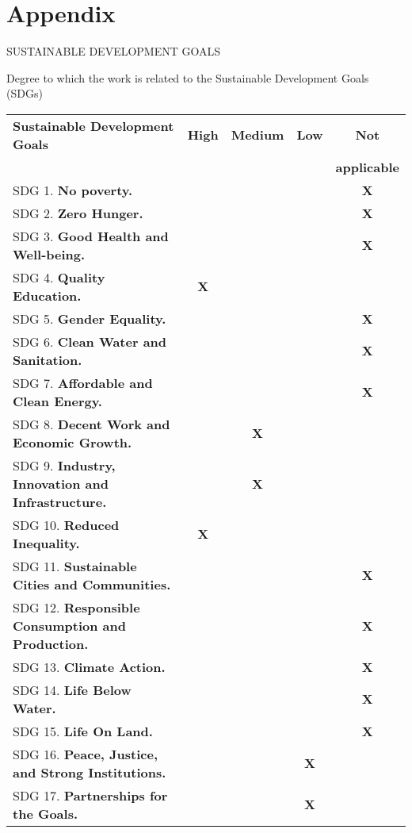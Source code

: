 \documentclass[11pt]{article}
\begin{document}
\phantom{x}

\vspace{1ex}

\section*{Appendix}

\vspace{2ex}

SUSTAINABLE DEVELOPMENT GOALS

\vspace{4ex}

Degree to which the work is related to the Sustainable Development Goals (SDGs)

\vspace{2ex}

\begin{tabular}{|l|c|c|c|c|}\hline
\textbf{Sustainable Development Goals} & \textbf{High} & \textbf{Medium} & \textbf{Low} & \textbf{Not} \\
& & & & \textbf{applicable} \\ \hline
SDG 1.  \textbf{No poverty.}                            & & & & \textbf{X} \\ \hline
SDG 2.  \textbf{Zero Hunger.}                                  & & & & \textbf{X} \\ \hline
SDG 3.  \textbf{Good Health and Well-being.}                            & & & & \textbf{X} \\ \hline
SDG 4.  \textbf{Quality Education.}                       &\textbf{X} & & & \\ \hline
SDG 5.  \textbf{Gender Equality.}                         & & & & \textbf{X} \\ \hline
SDG 6.  \textbf{Clean Water and Sanitation.}                    & & & & \textbf{X} \\ \hline
SDG 7.  \textbf{Affordable and Clean Energy.}     & & & & \textbf{X} \\ \hline
SDG 8.  \textbf{Decent Work and Economic Growth.}    & & \textbf{X} & & \\ \hline
SDG 9.  \textbf{Industry, Innovation and Infrastructure.}   & &\textbf{X} & & \\ \hline
SDG 10. \textbf{Reduced Inequality.}             & \textbf{X} & & & \\ \hline
SDG 11. \textbf{Sustainable Cities and Communities.}           & & & &\textbf{X} \\ \hline
SDG 12. \textbf{Responsible Consumption and Production.}          & & & &\textbf{X} \\ \hline
SDG 13. \textbf{Climate Action.}                        & & & &\textbf{X} \\ \hline
SDG 14. \textbf{Life Below Water.}                               & & & &\textbf{X} \\ \hline
SDG 15. \textbf{Life On Land.}               & & & &\textbf{X} \\ \hline
SDG 16. \textbf{Peace, Justice, and Strong Institutions.}      & & & \textbf{X} & \\ \hline
SDG 17. \textbf{Partnerships for the Goals.}               & & &\textbf{X} & \\ \hline
\end{tabular}
\end{document}

